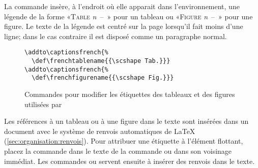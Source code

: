 La commande \cmd{\caption} insère,  à l'endroit où elle
apparait dans l'environnement, une légende de la forme «\textsc{Table}
\emph{n}~--~» pour un tableau ou «\textsc{Figure}
\emph{n}~--~» pour une figure. Le texte de la légende est
centré sur la page lorsqu'il fait moins d'une ligne; dans le cas
contraire il est disposé comme un paragraphe normal.


\begin{figure}
\begin{lstlisting}
\addto\captionsfrench{%
  \def\frenchtablename{{\scshape Tab.}}}
\addto\captionsfrench{%
  \def\frenchfigurename{{\scshape Fig.}}}
\end{lstlisting}
  \caption{Commandes pour modifier les étiquettes des tableaux et des
    figures utilisées par }
  \label{fig:tableaux+figures:captionsfrench}
\end{figure}

Les références à un tableau ou à une figure dans le texte sont
insérées dans un document avec le système de renvois automatiques de
{\LaTeX} (\autoref{sec:organisation:renvois}). Pour attribuer une
étiquette à l'élément flottant, placez la commande \cmd{\label} dans
le texte de la commande \cmd{\caption} ou dans son voisinage immédiat.
Les commandes \cmd{\ref} ou \cmd{\autoref} servent ensuite à insérer
des renvois dans le texte.

